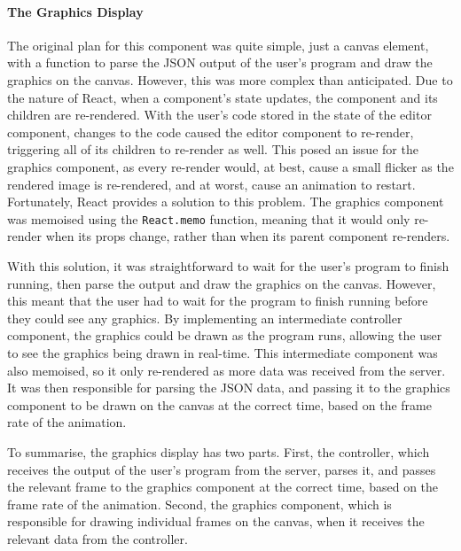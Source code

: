\documentclass[../main.tex]{subfiles}
\begin{document}
                \paragraph{The Graphics Display}
                    The original plan for this component was quite simple, just a canvas element,
                        with a function to parse the JSON output of the user's program and draw the
                        graphics on the canvas.
                    However, this was more complex than anticipated.
                    Due to the nature of React, when a component's state updates, the component and
                        its children are re-rendered.
                    With the user's code stored in the state of the editor component, changes to
                        the code caused the editor component to re-render, triggering all of its
                        children to re-render as well.
                    This posed an issue for the graphics component, as every re-render would, at
                        best, cause a small flicker as the rendered image is re-rendered, and at worst,
                        cause an animation to restart.
                    Fortunately, React provides a solution to this problem.
                    The graphics component was memoised using the \texttt{React.memo} function,
                        meaning that it would only re-render when its props change, rather than when
                        its parent component re-renders.

                    With this solution, it was straightforward to wait for the user's program to
                        finish running, then parse the output and draw the graphics on the canvas.
                    However, this meant that the user had to wait for the program to finish running
                        before they could see any graphics.
                    By implementing an intermediate controller component, the graphics could be
                        drawn as the program runs, allowing the user to see the graphics being drawn in
                        real-time.
                    This intermediate component was also memoised, so it only re-rendered as more
                        data was received from the server.
                    It was then responsible for parsing the JSON data, and passing it to the
                        graphics component to be drawn on the canvas at the correct time, based on the
                        frame rate of the animation.

                    To summarise, the graphics display has two parts.
                    First, the controller, which receives the output of the user's program from the
                        server, parses it, and passes the relevant frame to the graphics component at
                        the correct time, based on the frame rate of the animation.
                    Second, the graphics component, which is responsible for drawing individual
                        frames on the canvas, when it receives the relevant data from the controller.
\end{document}
